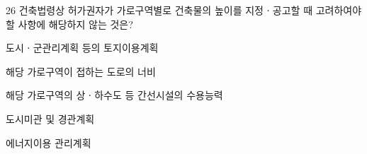 \begin{question}{26}
건축법령상 허가권자가 가로구역별로 건축물의 높이를 지정ㆍ공고할 때 고려하여야 할 사항에 해당하지 않는 것은?
\begin{choices}
  \item 도시ㆍ군관리계획 등의 토지이용계획
  \item 해당 가로구역이 접하는 도로의 너비
  \item 해당 가로구역의 상ㆍ하수도 등 간선시설의 수용능력
  \item 도시미관 및 경관계획
  \item 에너지이용 관리계획
\end{choices}
\end{question}
